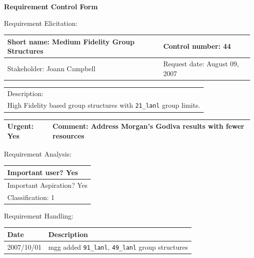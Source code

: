 \begin{center}\Large\bf
Requirement Control Form
\end{center}
\vspace{24pt}

Requirement Elicitation:

\begin{tabular}{|p{211pt}|p{211pt}|} \hline
Short name: Medium Fidelity Group Structures & Control number: 44\\ \hline
Stakeholder: Joann Campbell & Request date: August 09, 2007\\
\end{tabular}
\begin{tabular}{|p{433pt}|} \hline
Description: \\ 
High Fidelity based group structures with \texttt{21\_lanl} group limits.\\
\hline
\end{tabular} 
\begin{tabular}{|p{211pt}|p{211pt}|} \hline
Urgent: Yes & Comment: Address Morgan's Godiva results with fewer resources \\ \hline
\end{tabular}

\vspace{24pt}

Requirement Analysis:

\begin{tabular}{|p{433pt}|} \hline
Important user? Yes \\ \hline
Important Aspiration? Yes \\ \hline
Classification: 1 \\ \hline
\end{tabular}
\vspace{24pt}

Requirement Handling:

\begin{tabular}{|p{72pt}|p{351pt}|} \hline
Date & Description \\ \hline
2007/10/01 & mgg added \texttt{91\_lanl}, \texttt{49\_lanl} group
structures \\ \hline 
\end{tabular}
